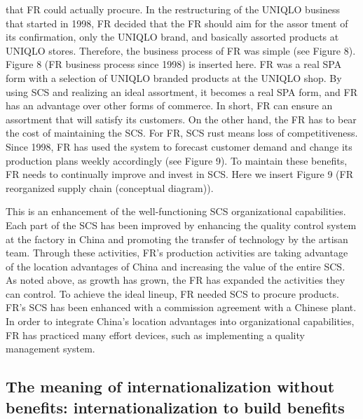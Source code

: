 \documentclass[12pt,]{article}
\begin{document}
that FR could actually procure. In the restructuring of the UNIQLO
business that started in 1998, FR decided that the FR should aim for the
assor tment of its confirmation, only the UNIQLO brand, and basically
assorted products at UNIQLO stores. Therefore, the business process of
FR was simple (see Figure 8). Figure 8 (FR business process since 1998)
is inserted here. FR was a real SPA form with a selection of UNIQLO
branded products at the UNIQLO shop. By using SCS and realizing an ideal
assortment, it becomes a real SPA form, and FR has an advantage over
other forms of commerce. In short, FR can ensure an assortment that will
satisfy its customers. On the other hand, the FR has to bear the cost of
maintaining the SCS. For FR, SCS rust means loss of competitiveness.
Since 1998, FR has used the system to forecast customer demand and
change its production plans weekly accordingly (see Figure 9). To
maintain these benefits, FR needs to continually improve and invest in
SCS. Here we insert Figure 9 (FR reorganized supply chain (conceptual
diagram)).

This is an enhancement of the well-functioning SCS organizational
capabilities. Each part of the SCS has been improved by enhancing the
quality control system at the factory in China and promoting the
transfer of technology by the artisan team. Through these activities,
FR's production activities are taking advantage of the location
advantages of China and increasing the value of the entire SCS. As noted
above, as growth has grown, the FR has expanded the activities they can
control. To achieve the ideal lineup, FR needed SCS to procure products.
FR's SCS has been enhanced with a commission agreement with a Chinese
plant. In order to integrate China's location advantages into
organizational capabilities, FR has practiced many effort devices, such
as implementing a quality management system.

\hypertarget{the-meaning-of-internationalization-without-benefits-internationalization-to-build-benefits}{%
\subsection{The meaning of internationalization without benefits:
internationalization to build
benefits}\label{the-meaning-of-internationalization-without-benefits-internationalization-to-build-benefits}}
\end{document}
